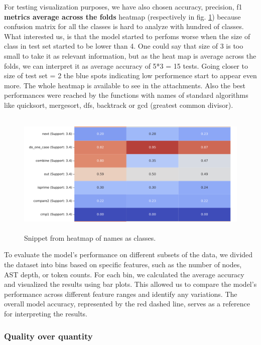 \documentclass[10pt,english,a4paper]{report}
\begin{document}
For testing visualization purposes, we have also chosen accuracy, precision, f1 \textbf{metrics average across the folds} heatmap (respectively in fig. \ref{fig:heatmap_snippet}) because 
confusion matrix for all the classes is hard to analyze with hundred of classes. What interested us,
is that the model started to perfoms worse  when the size of class in test set started to be lower than 4. 
One could say that size of 3 is too small to take it as relevant information, but as the heat map is average
across the folds, we can interpret it as average accuracy of 5*3 = 15 tests. Going closer to size of test set = 2
the blue spots indicating low performence start to appear even more. The whole heatmap is available to see in the attachments. Also the best
performances were reached by the functions with names of standard algorithms like quicksort, mergesort, dfs, backtrack or gcd (greatest common divisor). 


\begin{figure}[H]
    \centering
    \includegraphics[width=16cm, height=6cm]{figures/heatmap_snippet.png}
    \caption{Snippet from heatmap of names as classes.}
    \label{fig:heatmap_snippet}
\end{figure}

To evaluate the model's performance on different subsets of the data, 
we divided the dataset into bins based on specific features, such as 
the number of nodes, AST depth, or token counts. For each bin, we 
calculated the average accuracy and visualized the results using bar 
plots. This allowed us to compare the model's performance across 
different feature ranges and identify any variations. The overall 
model accuracy, represented by the red dashed line, serves as a 
reference for interpreting the results. \\

\subsubsection{Quality over quantity}
\end{document}

